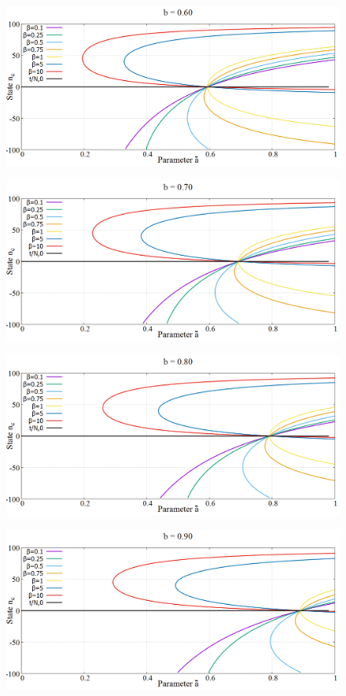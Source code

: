 \begin{figure}[h!]
 \centering
  \includegraphics[width=\linewidth]{images/appendix/phaseSpace/6.png}
\end{figure}
\newpage
\begin{figure}[h!]
 \centering
  \includegraphics[width=\linewidth]{images/appendix/phaseSpace/7.png}
\end{figure}

\begin{figure}[h!]
 \centering
  \includegraphics[width=\linewidth]{images/appendix/phaseSpace/8.png}
\end{figure}
\newpage
\begin{figure}[h!]
 \centering
  \includegraphics[width=\linewidth]{images/appendix/phaseSpace/9.png}
\end{figure}

